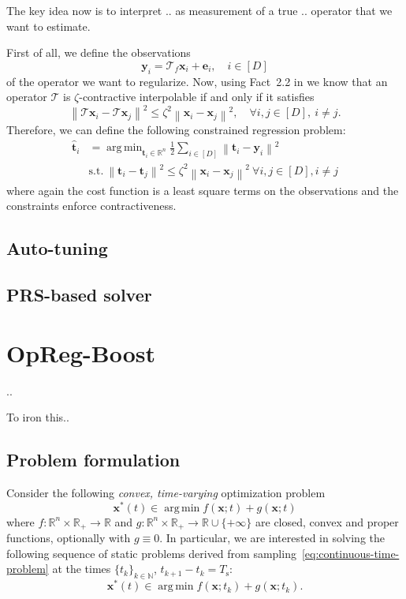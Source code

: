 \documentclass{article}
\DeclareMathOperator*{\argmin}{arg\,min}
\newcommand{\norm}[1]{\left\lVert#1\right\rVert}
\newcommand{\N}{\mathbb{N}}
\newcommand{\R}{\mathbb{R}}
\newcommand{\e}{\mathbold{e}}
\newcommand{\tv}{\mathbold{t}}
\newcommand{\x}{\mathbold{x}}
\newcommand{\y}{\mathbold{y}}
\newcommand{\T}{\mathcal{T}}
\newcommand{\Ts}{T_\mathrm{s}}
\begin{document}
The key idea now is to interpret .. as measurement of a true .. operator that we want to estimate. 
 


First of all, we define the observations
$$
	\y_i = \T_f \x_i + \e_i, \quad i \in [D]
$$
of the operator we want to regularize. Now, using Fact~2.2 in \cite{ryu_operator_2020} we know that an operator $\T$ is $\zeta$-contractive interpolable if and only if it satisfies
$$
	\norm{\T \x_i - \T \x_j}^2 \leq \zeta^2 \norm{\x_i - \x_j}^2, \quad \forall i,j \in [D], \ i \neq j.
$$
Therefore, we can define the following constrained regression problem:
\begin{equation}\label{eq:operator-regression}
\begin{split}
	\hat{\tv}_i &= \argmin_{\tv_i \in \R^n} \frac{1}{2} \sum_{i \in [D]} \norm{\tv_i - \y_i}^2 \\
	&\text{s.t.} \ \norm{\tv_i - \tv_j}^2 \leq \zeta^2 \norm{\x_i - \x_j}^2 \ \forall i,j \in [D], i \neq j
\end{split}
\end{equation}
where again the cost function is a least square terms on the observations and the constraints enforce contractiveness.



\subsection{Auto-tuning }

\subsection{PRS-based solver}

\section{OpReg-Boost}

..




To iron this.. 



\subsection{Problem formulation}
Consider the following \emph{convex, time-varying} optimization problem
\begin{equation}\label{eq:continuous-time-problem}
	\x^*(t) \in \argmin f(\x; t) + g(\x; t)
\end{equation}
where $f : \R^n \times \R_+ \to \R$ and $g : \R^n \times \R_+ \to \R \cup \{ +\infty \}$ are closed, convex and proper functions, optionally with $g \equiv 0$. In particular, we are interested in solving the following sequence of static problems derived from sampling~\eqref{eq:continuous-time-problem} at the times $\{ t_k \}_{k \in \N}$, $t_{k+1} - t_k = \Ts$:
\begin{equation}\label{eq:base-problem}
	\x^*(t) \in \argmin f(\x; t_k) + g(\x; t_k).
\end{equation}
\end{document}
